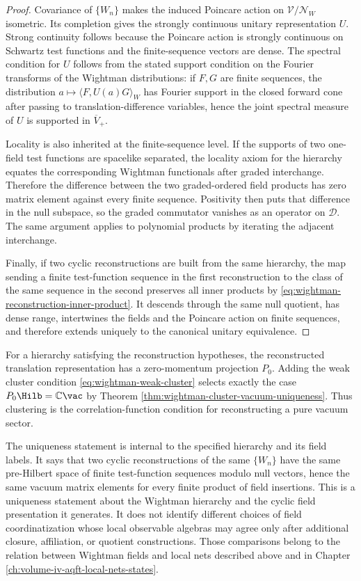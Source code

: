 \begin{proof}
Covariance of \(\{W_n\}\) makes the induced Poincare action on
\(\mathcal V/\mathcal N_W\) isometric.  Its completion gives the strongly
continuous unitary representation \(U\).  Strong continuity follows because
the Poincare action is strongly continuous on Schwartz test functions and the
finite-sequence vectors are dense.  The spectral condition for \(U\) follows
from the stated support condition on the Fourier transforms of the Wightman
distributions: if \(F,G\) are finite sequences, the distribution
\(a\mapsto\langle F,U(a)G\rangle_W\) has Fourier support in the closed forward
cone after passing to translation-difference variables, hence the joint
spectral measure of \(U\) is supported in \(\overline V_+\).

Locality is also inherited at the finite-sequence level.  If the supports of
two one-field test functions are spacelike separated, the locality axiom for
the hierarchy equates the corresponding Wightman functionals after graded
interchange.  Therefore the difference between the two graded-ordered field
products has zero matrix element against every finite sequence.  Positivity
then puts that difference in the null subspace, so the graded commutator
vanishes as an operator on \(\mathcal D\).  The same argument applies to
polynomial products by iterating the adjacent interchange.

Finally, if two cyclic reconstructions are built from the same hierarchy, the
map sending a finite test-function sequence in the first reconstruction to the
class of the same sequence in the second preserves all inner products by
\eqref{eq:wightman-reconstruction-inner-product}.  It descends through the
same null quotient, has dense range, intertwines the fields and the Poincare
action on finite sequences, and therefore extends uniquely to the canonical
unitary equivalence.
\end{proof}

For a hierarchy satisfying the reconstruction hypotheses, the reconstructed
translation representation has a zero-momentum projection \(P_0\).  Adding the
weak cluster condition \eqref{eq:wightman-weak-cluster} selects exactly the
case \(P_0\Hilb=\mathbb C\vac\) by Theorem
\ref{thm:wightman-cluster-vacuum-uniqueness}.  Thus clustering is the
correlation-function condition for reconstructing a pure vacuum sector.

The uniqueness statement is internal to the specified hierarchy and its field
labels.  It says that two cyclic reconstructions of the same \(\{W_n\}\) have
the same pre-Hilbert space of finite test-function sequences modulo null
vectors, hence the same vacuum matrix elements for every finite product of
field insertions.  This is a uniqueness statement about the Wightman hierarchy
and the cyclic field presentation it generates.  It does not identify different
choices of field coordinatization whose local observable algebras may agree
only after additional closure, affiliation, or quotient constructions.  Those
comparisons belong to the relation between Wightman fields and local nets
described above and in Chapter
\ref{ch:volume-iv-aqft-local-nets-states}.


